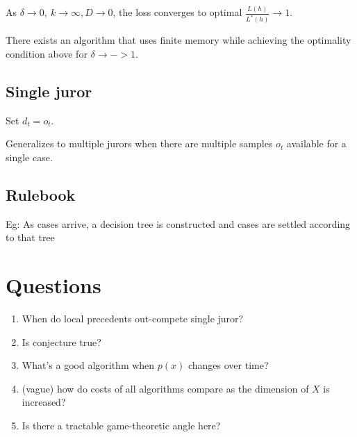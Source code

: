 \documentclass{article}
\begin{document}
\begin{theorem}
As $\delta\rightarrow 0,\ k\rightarrow \infty, D\rightarrow 0$, the loss converges to optimal $\frac{L(h)}{L^*(h)}\rightarrow 1$.
\end{theorem}

\begin{conjecture}
There exists an algorithm that uses finite memory while achieving the optimality condition above for $\delta \rightarrow ->1$.
\end{conjecture}

\subsection{Single juror}
Set $d_t=o_t$.

Generalizes to multiple jurors when there are multiple samples $o_t$ available for a single case.

\subsection{Rulebook}

Eg: As cases arrive, a decision tree is constructed and cases are settled according to that tree



\section{Questions }

\begin{enumerate}
\item When do local precedents out-compete single juror?
\item Is conjecture true?
\item What's a good algorithm when $p(x)$ changes over time?
\item (vague) how do costs of all algorithms compare as the dimension of $X$ is increased?
\item Is there a tractable game-theoretic angle here?
\end{enumerate}
\end{document}
